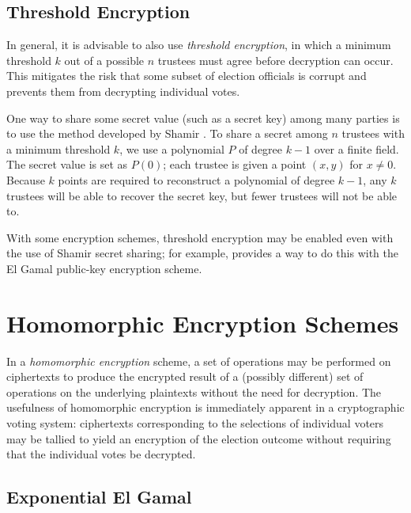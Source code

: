 \subsection{Threshold Encryption} \label{evote:design:threshold}
In general, it is advisable to also use \emph{threshold encryption}, in which a minimum threshold $k$ out of a possible $n$ trustees must agree before decryption can occur. This mitigates the risk that some subset of election officials is corrupt and prevents them from decrypting individual votes.

One way to share some secret value (such as a secret key) among many parties is to use the method developed by Shamir \cite{shamir79}. To share a secret among $n$ trustees with a minimum threshold $k$, we use a polynomial $P$ of degree $k-1$ over a finite field. The secret value is set as $P(0)$; each trustee is given a point $(x, y)$ for $x \neq 0$. Because $k$ points are required to reconstruct a polynomial of degree $k-1$, any $k$ trustees will be able to recover the secret key, but fewer trustees will not be able to.

With some encryption schemes, threshold encryption may be enabled even with the use of Shamir secret sharing; for example, \cite{pedersen91, gennaro} provides a way to do this with the El Gamal public-key encryption scheme.

\section{Homomorphic Encryption Schemes} \label{evote:homomorphic}

In a \emph{homomorphic encryption} scheme, a set of operations may be performed on ciphertexts to produce the encrypted result of a (possibly different) set of operations on the underlying plaintexts without the need for decryption. The usefulness of homomorphic encryption is immediately apparent in a cryptographic voting system: ciphertexts corresponding to the selections of individual voters may be tallied to yield an encryption of the election outcome without requiring that the individual votes be decrypted.

\subsection{Exponential El Gamal} \label{evote:homomorphic:elgamal}

